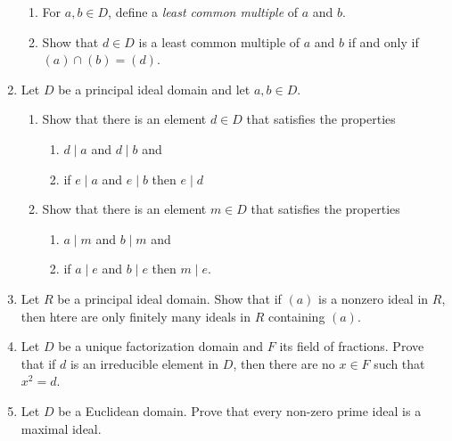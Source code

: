 \documentclass{article}
\theoremstyle{definition}
\begin{document}
\begin{enumerate}
            \begin{enumerate}
                \item For $a,b \in D$, define a \textit{least common multiple} of $a$ and $b$.
                \item Show that $d\in D$ is a least common multiple of $a$ and $b$ if and only if $(a)\cap (b)=(d)$.
            \end{enumerate}

            \item Let $D$ be a principal ideal domain and let $a,b \in D$.
            
            \begin{enumerate}
                \item Show that there is an element $d\in D$ that satisfies the properties 
                
                \begin{enumerate}
                    \item $d\mid a$ and $d\mid b$ and 
                    \item if $e\mid a$ and $e\mid b$ then $e\mid d$
                \end{enumerate}

                \item Show that there is an element $m\in D$ that satisfies the properties
                
                \begin{enumerate}
                    \item $a\mid m$ and $b\mid m$ and 
                    \item if $a\mid e$ and $b\mid e$ then $m\mid e$.
                \end{enumerate}
            \end{enumerate}

            \item Let $R$ be a principal ideal domain. Show that if $(a)$ is a nonzero ideal in $R$, then htere are only finitely many ideals in $R$ containing $(a)$.
            
            \item Let $D$ be a unique factorization domain and $F$ its field of fractions. Prove that if $d$ is an irreducible element in $D$, then there are no $x\in F$ such that $x^2=d$.
            
            \item Let $D$ be a Euclidean domain. Prove that every non-zero prime ideal is a maximal ideal. 
            

\end{enumerate}
\end{document}
